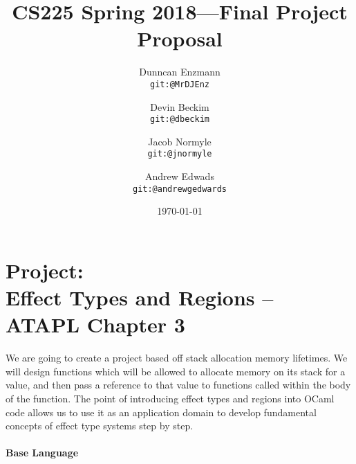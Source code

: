\documentclass{article}
\title{CS225 Spring 2018---Final Project Proposal}
\author{
  Dunncan Enzmann \\ \small{\texttt{git:@MrDJEnz}}
  \and Devin Beckim \\ \small{\texttt{git:@dbeckim}}
  \and Jacob Normyle \\ \small{\texttt{git:@jnormyle}}
  \and Andrew Edwads \\ \small{\texttt{git:@andrewgedwards}}
}
\date{\today}
\begin{document}
\maketitle

\section*{Project: \\Effect Types and Regions --  ATAPL Chapter 3}

We are going to create a project based off stack allocation memory lifetimes. We will design functions which will be allowed to allocate memory on its stack for a value, and then pass a reference to that value to functions called within the body of the function. The point of introducing effect types and regions into OCaml code allows us to use it as an application domain to develop fundamental concepts of effect type systems step by step.

\paragraph{Base Language}
\end{document}
